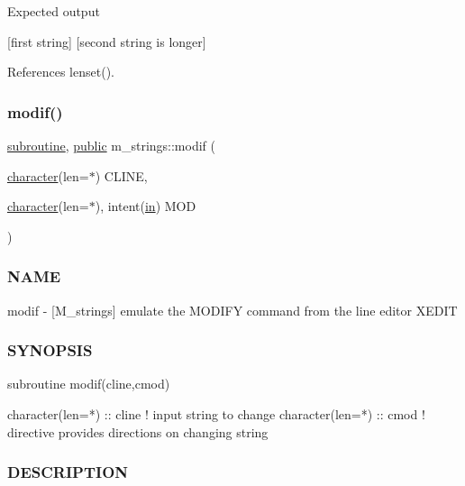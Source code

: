 Expected output

\mbox{[}first string\mbox{]} \mbox{[}second string is longer\mbox{]} 

References lenset().

\mbox{\label{namespacem__strings_aec887410b018916a683fbb2ae529f8c5}} 
\subsubsection{\texorpdfstring{modif()}{modif()}}
{\footnotesize\ttfamily \hyperlink{M__stopwatch_83_8txt_acfbcff50169d691ff02d4a123ed70482}{subroutine}, \hyperlink{M__stopwatch_83_8txt_a2f74811300c361e53b430611a7d1769f}{public} m\+\_\+strings\+::modif (\begin{DoxyParamCaption}\item[{\hyperlink{option__stopwatch_83_8txt_abd4b21fbbd175834027b5224bfe97e66}{character}(len=$\ast$)}]{C\+L\+I\+NE,  }\item[{\hyperlink{option__stopwatch_83_8txt_abd4b21fbbd175834027b5224bfe97e66}{character}(len=$\ast$), intent(\hyperlink{M__journal_83_8txt_afce72651d1eed785a2132bee863b2f38}{in})}]{M\+OD }\end{DoxyParamCaption})}



\subsubsection*{N\+A\+ME}

modif -\/ \mbox{[}M\+\_\+strings\mbox{]} emulate the M\+O\+D\+I\+FY command from the line editor X\+E\+D\+IT 

\subsubsection*{S\+Y\+N\+O\+P\+S\+IS}

\begin{DoxyVerb}subroutine modif(cline,cmod)

 character(len=*) :: cline ! input string to change
 character(len=*) :: cmod  ! directive provides directions on changing string
\end{DoxyVerb}


\subsubsection*{D\+E\+S\+C\+R\+I\+P\+T\+I\+ON}

